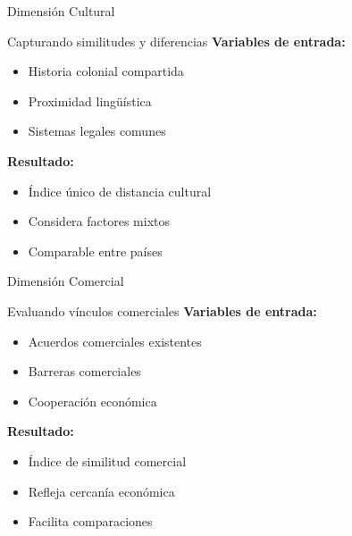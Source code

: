 \documentclass{beamer}
\begin{document}
\begin{frame}{Dimensión Cultural}
    \begin{block}{Capturando similitudes y diferencias}
        \textbf{Variables de entrada:}
        \begin{itemize}
            \item Historia colonial compartida
            \item Proximidad lingüística
            \item Sistemas legales comunes
        \end{itemize}
        
        \textbf{Resultado:}
        \begin{itemize}
            \item Índice único de distancia cultural
            \item Considera factores mixtos
            \item Comparable entre países
        \end{itemize}
    \end{block}
\end{frame}

\begin{frame}{Dimensión Comercial}
    \begin{block}{Evaluando vínculos comerciales}
        \textbf{Variables de entrada:}
        \begin{itemize}
            \item Acuerdos comerciales existentes
            \item Barreras comerciales
            \item Cooperación económica
        \end{itemize}
        
        \textbf{Resultado:}
        \begin{itemize}
            \item Índice de similitud comercial
            \item Refleja cercanía económica
            \item Facilita comparaciones
        \end{itemize}
    \end{block}
\end{frame}
\end{document}
